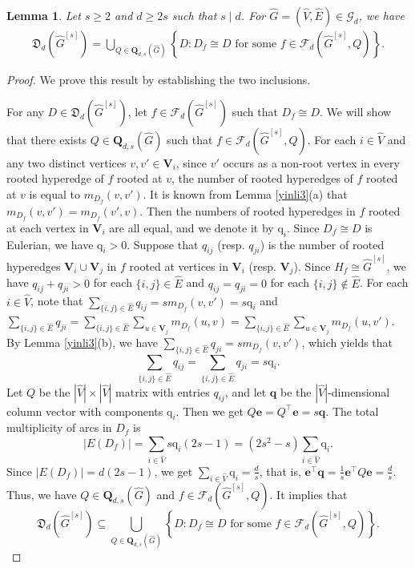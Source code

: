 \documentclass[10pt,a4paper]{amsart}
\newtheorem{lem}{Lemma}
\begin{document}
\begin{lem}\label{yinli4}
Let $s \geq 2$ and $d \geq 2s$ such that $s \mid d$.
For $\widehat{G} = (\widehat{V},\widehat{E}) \in \mathcal{G}_{d}$,
we have
\begin{align*}
\mathfrak{D}_{d}(\widehat{G}^{[s]})=
\bigcup_{Q \in \mathbf{Q}_{d,s}(\widehat{G})}\left\{ D : \mbox{$D_{f} \cong D$ for some $f \in \mathcal{F}_{d}(\widehat{G}^{[s]},Q)$} \right\}.
\end{align*}
\end{lem}

\begin{proof}
We prove this result by establishing the two inclusions.

For any $D \in \mathfrak{D}_{d}(\widehat{G}^{[s]})$,
let $f \in \mathcal{F}_{d}(\widehat{G}^{[s]})$ such that $D_{f} \cong D$.
We will show that there exists $Q \in \mathbf{Q}_{d,s}(\widehat{G})$ such that $f \in \mathcal{F}_{d}(\widehat{G}^{[s]},Q)$.
For each $i \in \widehat{V}$ and any two distinct vertices $v,v' \in \mathbf{V}_{i}$,
since $v'$ occurs as a non-root vertex in every rooted hyperedge of $f$ rooted at $v$,
the number of rooted hyperedges of $f$ rooted at $v$ is equal to $m_{D_f}(v,v')$.
It is known from Lemma \ref{yinli3}(a) that $m_{D_f}(v,v')=m_{D_f}(v',v)$.
Then the numbers of rooted hyperedges in $f$ rooted at each vertex in $\mathbf{V}_{i}$ are all equal,
and we denote it by $\mathrm{q}_{i}$.
Since $D_{f} \cong D$ is Eulerian,
we have $\mathrm{q}_{i} >0$.
Suppose that $q_{ij}$ (resp. $q_{ji}$) is the number of rooted hyperedges $\mathbf{V}_{i} \cup \mathbf{V}_{j}$ in $f$ rooted at vertices in $\mathbf{V}_{i}$ (resp. $\mathbf{V}_{j}$).
Since $H_{f} \cong \widehat{G}^{[s]}$,
we have $q_{ij}+q_{ji}>0$ for each $\{i,j\} \in \widehat{E}$ and $q_{ij}=q_{ji}=0$ for each $\{i,j\} \notin \widehat{E}$.
For each $i \in \widehat{V}$,
note that $\sum_{\{i,j\} \in \widehat{E}}q_{ij}=sm_{D_f}(v,v')=s\mathrm{q}_{i}$ and $\sum_{\{i,j\} \in \widehat{E}}q_{ji}=\sum_{\{i,j\} \in \widehat{E}}\sum_{u \in \mathbf{V}_{j}}m_{D_f}(u,v)=\sum_{\{i,j\} \in \widehat{E}}\sum_{u \in \mathbf{V}_{j}}m_{D_f}(u,v')$.
By Lemma \ref{yinli3}(b),
we have $\sum_{\{i,j\}\in\widehat{E}}q_{ji}=sm_{D_f}(v,v')$,
which yields that $$\sum_{\{i,j\} \in \widehat{E}}q_{ij}=\sum_{\{i,j\}\in\widehat{E}}q_{ji}=s\mathrm{q}_{i}.$$
Let $Q$ be the $|\widehat{V}| \times |\widehat{V}|$ matrix with entries $q_{ij}$,
and let $\mathbf{q}$ be the $|\widehat{V}|$-dimensional column vector with components $\mathrm{q}_{i}$.
Then we get $Q\mathbf{e}=Q^{\top}\mathbf{e}=s\mathbf{q}$.
The total multiplicity of arcs in $D_f$ is $$|E(D_f)|=\sum_{i \in \widehat{V}}s\mathrm{q}_{i}(2s-1)=(2s^{2}-s)\sum_{i \in \widehat{V}}\mathrm{q}_{i}.$$
Since $|E(D_f)|=d(2s-1)$,
we get $\sum_{i \in \widehat{V}}\mathrm{q}_{i}=\frac{d}{s}$,
that is, $\mathbf{e}^{\top}\mathbf{q}=\frac{1}{s}\mathbf{e}^{\top}Q\mathbf{e}=\frac{d}{s}$.
Thus,
we have $Q \in \mathbf{Q}_{d,s}(\widehat{G})$ and $f \in \mathcal{F}_{d}(\widehat{G}^{[s]},Q)$.
It implies that $$\mathfrak{D}_{d}(\widehat{G}^{[s]})\subseteq
\bigcup_{Q \in \mathbf{Q}_{d,s}(\widehat{G})}\left\{ D : \mbox{$D_{f} \cong D$ for some $f \in \mathcal{F}_{d}(\widehat{G}^{[s]},Q)$} \right\}.$$


\end{proof}
\end{document}

